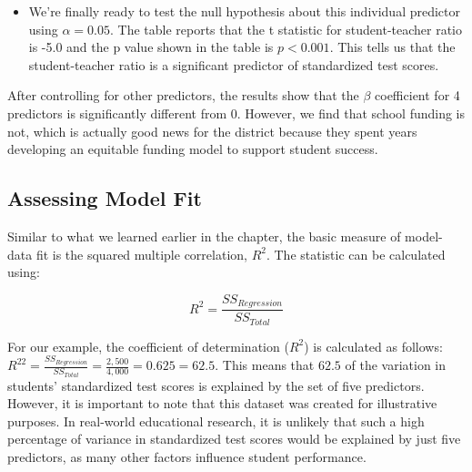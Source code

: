 \documentclass[
  letterpaper,
  DIV=11,
  numbers=noendperiod]{scrreprt}
\begin{document}
\begin{itemize}
\begin{itemize}
    where \(\beta_{xp}\) represents the standardized slope associated
    with predictor p, \(b_{xp}\) is the unstandardized slope for
    predictor \(p\), \(SD_Y\) is the standard deviation of the dependent
    variable, and \(SD_{xp}\) is the standard deviation of predictor
    \(p\). Standardized slopes are typically included in computer output
    and reported as part of your results. Our result for the
    Student-Teacher ratio independent variable shows that with the
    effects of other predictors held constant, for each one standard
    deviation increase in Student-Teacher ratios, we expect standardized
    test scores to decrease 0.3 standard deviations. It can get a little
    confusing because people use either \(B\) or \(b\) to refer to
    regression coefficients, but if you see both \(\beta\) and \(b\),
    the former means standardized, and the latter is unstandardized.
  \end{itemize}
\item
  We're finally ready to test the null hypothesis about this individual
  predictor using \(\alpha = 0.05\). The table reports that the t
  statistic for student-teacher ratio is -5.0 and the p value shown in
  the table is \(p < 0.001\). This tells us that the student-teacher
  ratio is a significant predictor of standardized test scores.
\end{itemize}

After controlling for other predictors, the results show that the
\(\beta\) coefficient for 4 predictors is significantly different from
0. However, we find that school funding is not, which is actually good
news for the district because they spent years developing an equitable
funding model to support student success.

\subsection{Assessing Model Fit\,}\label{assessing-model-fit}

Similar to what we learned earlier in the chapter, the basic measure of
model-data fit is the squared multiple correlation, \(R^2\). The
statistic can be calculated using:

\[
R^2 = \frac{SS_{Regression}}{SS_{Total}}
\]

For our example, the coefficient of determination (\(R^2\)) is
calculated as follows:
\(R^22 = \frac{SS_{Regression}}{SS_{Total}} = \frac{2,500}{4,000} = 0.625 = 62.5%
\). This means that \(62.5%
\) of the variation in students' standardized test scores is explained
by the set of five predictors. However, it is important to note that
this dataset was created for illustrative purposes. In real-world
educational research, it is unlikely that such a high percentage of
variance in standardized test scores would be explained by just five
predictors, as many other factors influence student performance.
\end{document}
